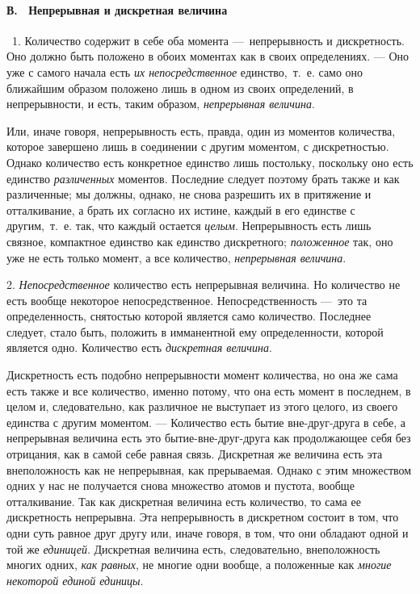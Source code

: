 \paragraph[В. \ Непрерывная и дискретная величина]{В. \ Непрерывная и
дискретная величина}
\ 1. Количество содержит в себе оба момента —~непрерывность и дискретность.
Оно должно быть положено в обоих моментах как в своих определениях. — Оно
уже с самого начала есть {\em их непосредственное}
единство,~т.~е. само оно ближайшим образом положено лишь в одном из своих
определений, в непрерывности, и есть, таким образом,
{\em непрерывная величина}.

Или, иначе говоря, непрерывность есть, правда, один из моментов количества,
которое завершено лишь в соединении с другим моментом, с дискретностью.
Однако количество есть конкретное единство лишь постольку, поскольку оно
есть единство {\em различенных} моментов. Последние
следует поэтому брать также и как различенные; мы должны, однако, не снова
разрешить их в притяжение и отталкивание, а брать их согласно их истине,
каждый в его единстве с другим,~т.~е. так, что каждый остается
{\em целым}. Непрерывность есть лишь связное,
компактное единство как единство дискретного;
{\em положенное} так, оно уже не есть только момент, а
все количество, {\em непрерывная величина}.

2. {\em Непосредственное} количество есть непрерывная
величина. Но количество не есть вообще некоторое непосредственное.
Непосредственность —~это та определенность, снятостью которой является само
количество. Последнее следует, стало быть, положить в имманентной ему
определенности, которой является одно. Количество есть
{\em дискретная величина}.

Дискретность есть подобно непрерывности момент количества, но она же сама
есть также и все количество, именно потому, что она есть момент в
последнем, в целом и, следовательно, как различное не выступает из этого
целого, из своего единства с другим моментом. — Количество есть бытие
вне-друг-друга в себе, а непрерывная величина есть это бытие-вне-друг-друга
как продолжающее себя без отрицания, как в самой себе равная связь.
Дискретная же величина есть эта внеположность как не непрерывная, как
прерываемая. Однако с этим множеством одних у нас не получается снова
множество атомов и пустота, вообще отталкивание. Так как дискретная
величина есть количество, то сама ее дискретность непрерывна. Эта
непрерывность в дискретном состоит в том, что одни суть равное друг другу
или, иначе говоря, в том, что они обладают одной и той же
{\em единицей}. Дискретная величина есть,
следовательно, внеположность многих одних, {\em как
равных}, не многие одни вообще, а положенные как
{\em многие некоторой единой единицы}.

